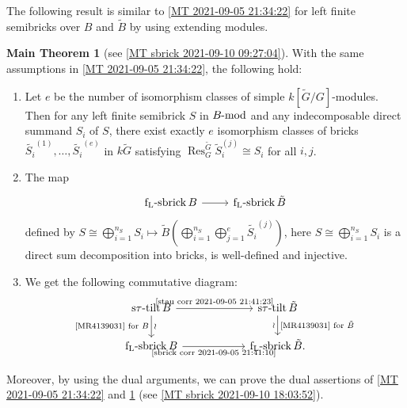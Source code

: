 \documentclass[pdftex,a4paper]{article}
\numberwithin{equation}{subsection}
\theoremstyle{definition}
\newtheorem{maintheorem}[theorem]{Main Theorem}
\newcommand{\lmod}{\operatorname{\mathrm{\hspace{-2pt}-mod}}}
\newcommand{\restr}{{\operatorname{Res}\nolimits}}
\newcommand{\stautilt}{\operatorname{\mathrm{s\tau-tilt}}}
\newcommand{\flsbrick}{\operatorname{\mathrm{f_L-sbrick}}}
\begin{document}
The following result is similar to \cref{MT 2021-09-05 21:34:22} for left finite semibricks over \(B\) and \(\tilde{B}\) by using extending modules.
\begin{maintheorem}[{see \cref{MT sbrick 2021-09-10 09:27:04}}]\label{MT sbrick 2021-09-06 11:12:51}
	With the same assumptions in \cref{MT 2021-09-05 21:34:22}, the following hold:
	\begin{enumerate}
		\item Let \(e\) be the number of isomorphism classes of simple \(k[\tilde{G}/G]\)-modules. Then for any left finite semibrick \(S\) in \(B\lmod\) and any indecomposable direct summand \(S_i\) of \(S\), there exist exactly \(e\) isomorphism classes of bricks \(\tilde{S_i}^{(1)}, \ldots, \tilde{S_i}^{(e)}\) in \(k\tilde{G}\) satisfying \(\restr_G^{\tilde{G}}\tilde{S}_i^{(j)}\cong S_i\) for all \(i,j\).
		\item The map
		      \begin{equation}\label{sbrick corr 2021-09-05 21:41:10}
			      \begin{tikzcd}[ampersand replacement=\&,row sep=1pt]
				      \flsbrick B \ar[r]\&\flsbrick \tilde{B}\\
			      \end{tikzcd}
		      \end{equation}
		      defined by \(S\cong \bigoplus_{i=1}^{n_{S}}S_i\mapsto \tilde{B}\left( \bigoplus_{i=1}^{n_S}\bigoplus_{j=1}^{e}\tilde{S_i}^{(j)} \right)\), here \(S\cong \bigoplus_{i=1}^{n_{S}}S_i\) is a direct sum decomposition into bricks, is well-defined and injective.
		\item We get the following  commutative diagram:
		      \begin{equation}
			      \begin{tikzcd}[ampersand replacement=\&, column sep=2cm]
				      \stautilt B\ar[d,"\text{\cite{MR4139031} for \(B\)}"',"\wr"] \ar[r,"\text{\eqref{stau corr 2021-09-05 21:41:23}}"]\&\stautilt \tilde{B} \ar[d,"\text{\cite{MR4139031} for \(\tilde{B}\)}","\wr"']\\
				      \flsbrick B\ar[r,"\text{\eqref{sbrick corr 2021-09-05 21:41:10}}"']\&\flsbrick \tilde{B}.
			      \end{tikzcd}
		      \end{equation}
	\end{enumerate}
\end{maintheorem}
Moreover, by using the dual arguments, we can prove the dual assertions of \cref{MT 2021-09-05 21:34:22} and \cref{MT sbrick 2021-09-06 11:12:51} (see \cref{MT sbrick 2021-09-10 18:03:52}).
\end{document}
